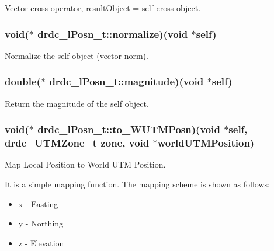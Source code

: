 Vector cross operator, resultObject = self cross object. 

\hypertarget{structdrdc__lPosn__t_7709e0a141c76489ce7f3c60e3d457f8}{
\subsubsection[normalize]{\setlength{\rightskip}{0pt plus 5cm}void($\ast$ {\bf drdc\_\-lPosn\_\-t::normalize})(void $\ast$self)}}
\label{structdrdc__lPosn__t_7709e0a141c76489ce7f3c60e3d457f8}


Normalize the self object (vector norm). 

\hypertarget{structdrdc__lPosn__t_d7162293346abf921b33d64d5eaa37fc}{
\subsubsection[magnitude]{\setlength{\rightskip}{0pt plus 5cm}double($\ast$ {\bf drdc\_\-lPosn\_\-t::magnitude})(void $\ast$self)}}
\label{structdrdc__lPosn__t_d7162293346abf921b33d64d5eaa37fc}


Return the magnitude of the self object. 

\hypertarget{structdrdc__lPosn__t_061d2b3a1190a967bac4f8520ac93f9c}{
\subsubsection[to\_\-WUTMPosn]{\setlength{\rightskip}{0pt plus 5cm}void($\ast$ {\bf drdc\_\-lPosn\_\-t::to\_\-WUTMPosn})(void $\ast$self, {\bf drdc\_\-UTMZone\_\-t} zone, void $\ast$worldUTMPosition)}}
\label{structdrdc__lPosn__t_061d2b3a1190a967bac4f8520ac93f9c}


Map Local Position to World UTM Position. 

It is a simple mapping function. The mapping scheme is shown as follows:\begin{itemize}
\item x - Easting\item y - Northing\item z - Elevation\end{itemize}


